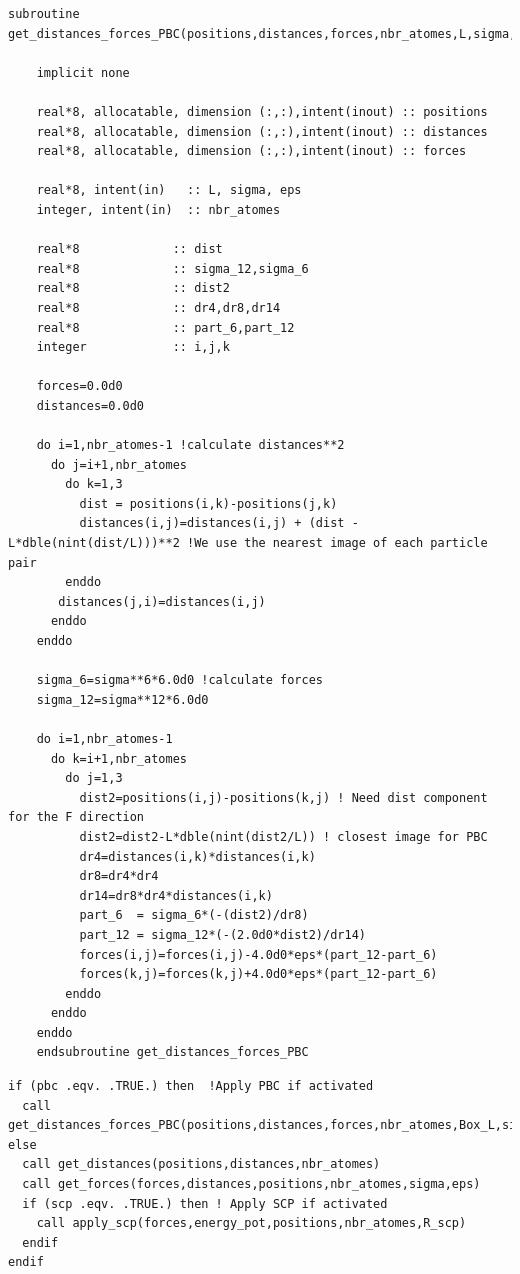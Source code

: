 \documentclass{cis320}
\begin{document}
\begin{lstlisting}[caption=Subroutine to apply a PBC.]
    subroutine get_distances_forces_PBC(positions,distances,forces,nbr_atomes,L,sigma,eps)

    implicit none
    
    real*8, allocatable, dimension (:,:),intent(inout) :: positions
    real*8, allocatable, dimension (:,:),intent(inout) :: distances
    real*8, allocatable, dimension (:,:),intent(inout) :: forces
    
    real*8, intent(in)   :: L, sigma, eps
    integer, intent(in)  :: nbr_atomes
    
    real*8             :: dist
    real*8             :: sigma_12,sigma_6
    real*8             :: dist2
    real*8             :: dr4,dr8,dr14
    real*8             :: part_6,part_12
    integer            :: i,j,k
    
    forces=0.0d0
    distances=0.0d0
    
    do i=1,nbr_atomes-1 !calculate distances**2
      do j=i+1,nbr_atomes
        do k=1,3
          dist = positions(i,k)-positions(j,k)
          distances(i,j)=distances(i,j) + (dist - L*dble(nint(dist/L)))**2 !We use the nearest image of each particle pair
        enddo 
       distances(j,i)=distances(i,j)
      enddo
    enddo
    
    sigma_6=sigma**6*6.0d0 !calculate forces
    sigma_12=sigma**12*6.0d0
    
    do i=1,nbr_atomes-1
      do k=i+1,nbr_atomes
        do j=1,3
          dist2=positions(i,j)-positions(k,j) ! Need dist component for the F direction
          dist2=dist2-L*dble(nint(dist2/L)) ! closest image for PBC
          dr4=distances(i,k)*distances(i,k)
          dr8=dr4*dr4
          dr14=dr8*dr4*distances(i,k)
          part_6  = sigma_6*(-(dist2)/dr8)
          part_12 = sigma_12*(-(2.0d0*dist2)/dr14) 
          forces(i,j)=forces(i,j)-4.0d0*eps*(part_12-part_6)
          forces(k,j)=forces(k,j)+4.0d0*eps*(part_12-part_6)
        enddo
      enddo
    enddo
    endsubroutine get_distances_forces_PBC\end{lstlisting}

\begin{lstlisting}[caption=Forbid using SCP together with PBC.]
if (pbc .eqv. .TRUE.) then  !Apply PBC if activated
  call get_distances_forces_PBC(positions,distances,forces,nbr_atomes,Box_L,sigma,eps)
else
  call get_distances(positions,distances,nbr_atomes)
  call get_forces(forces,distances,positions,nbr_atomes,sigma,eps)
  if (scp .eqv. .TRUE.) then ! Apply SCP if activated
    call apply_scp(forces,energy_pot,positions,nbr_atomes,R_scp)
  endif
endif \end{lstlisting}

\printbibliography
\end{document}
